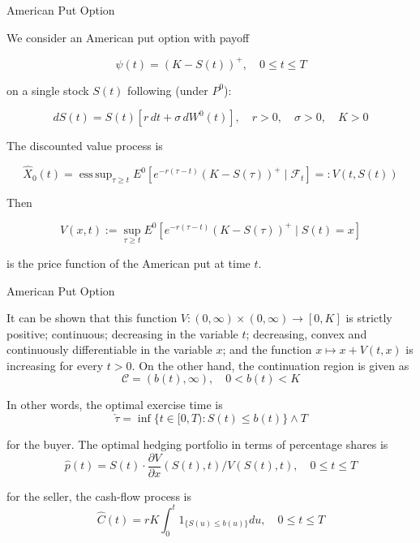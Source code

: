 \documentclass{beamer}
\DeclareMathOperator*{\esssup}{ess\,sup}
\begin{document}
\begin{frame}{American Put Option}

    {\footnotesize \footnotesize
    We consider an American put option with payoff

    \[
    \psi(t) = (K - S(t))^+, \quad 0 \leq t \leq T
    \]

    on a single stock \(S(t)\) following (under \(P^0\)):

    \[
    dS(t) = S(t)[r \, dt + \sigma \, dW^0(t)], \quad r > 0, \quad \sigma > 0, \quad K > 0
    \]

     \pause The discounted value process is

    \[
    \hat{X}_0(t) = \esssup_{\tau \geq t} E^0 
    \left[ e^{-r(\tau-t)} (K - S(\tau))^+ \mid \mathcal{F}_t \right] =: V(t, S(t))
    \]

    Then

    \[
    V(x, t) := \sup_{\tau \geq t} E^0 \left[ e^{-r(\tau-t)} (K - S(\tau))^+ \mid S(t) = x \right]
    \]

    is the price function of the American put at time \(t\).

    }

    
\end{frame}   

\begin{frame}{American Put Option}

    {\footnotesize \footnotesize
    It can be shown that this function \( V : (0, \infty) \times (0, \infty) \rightarrow [0, K] \) 
    is strictly positive; continuous; decreasing in the variable \( t \); decreasing, 
    convex and continuously differentiable in the variable \( x \); and the 
    function \( x \mapsto x + V(t, x) \) is increasing for every \( t > 0 \). 
    On the other hand, the continuation region is given as  
    \[
    \mathcal{C} = (b(t), \infty), \quad 0 < b(t) < K
    \]  
    
     \pause In other words, the optimal exercise time is  
    \[
    \check{\tau} = \inf\{t \in [0, T) : S(t) \leq b(t)\} \land T
    \]  

    for the buyer. The optimal hedging portfolio in terms of percentage shares is  
    \[
    \hat{p}(t) = S(t) \cdot \frac{\partial V}{\partial x} (S(t), t)/V(S(t), t), \quad 0 \leq t \leq T
    \]  

    for the seller, the cash-flow process is  
    \[
    \hat{C}(t) = rK \int_{0}^{t} 1_{\{S(u) \leq b(u)\}} du, \quad 0 \leq t \leq T
    \]
    }

    
\end{frame} 
\end{document}
